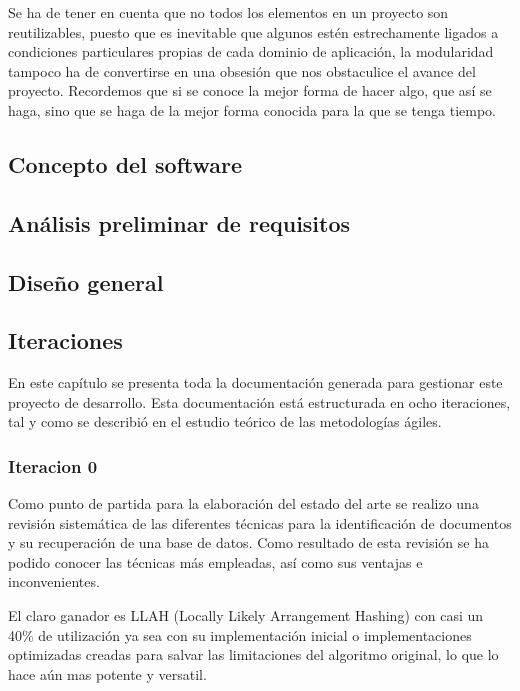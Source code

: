 Se ha de tener en cuenta que no todos los elementos en un proyecto son reutilizables, puesto que es inevitable que algunos estén estrechamente ligados a condiciones particulares propias de cada dominio de aplicación, la modularidad tampoco ha de convertirse en una obsesión que nos obstaculice el avance del proyecto. Recordemos que si se conoce la mejor forma de hacer algo,  que  así  se  haga,  sino  que  se  haga  de  la  mejor  forma  conocida  para  la  que  se  tenga tiempo. 
  
\subsection{Concepto del software}
\subsection{Análisis preliminar de requisitos}
\subsection{Diseño general}
\subsection{Iteraciones}
En este capítulo se presenta toda la documentación generada para gestionar este proyecto de desarrollo. Esta documentación está estructurada en ocho iteraciones, tal y como se describió en el estudio teórico de las metodologías ágiles. 

\subsubsection{Iteracion 0}
Como punto de partida para la elaboración del estado del arte se realizo una revisión sistemática de las diferentes técnicas para la identificación de documentos y su recuperación de una base de datos. Como resultado de esta revisión se ha podido conocer las técnicas más empleadas, así como sus ventajas e inconvenientes. 

El claro ganador es LLAH (Locally Likely Arrangement Hashing) con casi un 40\% de utilización ya sea con su implementación inicial o implementaciones optimizadas creadas para salvar las limitaciones del algoritmo original, lo que lo hace aún mas potente y versatil.


